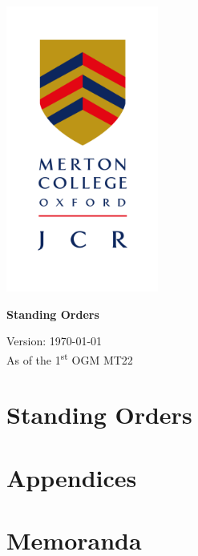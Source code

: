 \documentclass{standingorders}
\begin{document}
	\thispagestyle{empty}
	\begin{center}
		\includegraphics[width=5cm]{mertoncollegejcr}
		\begin{vplace}[0.1] \Huge  
			\textbf{Standing Orders}
		\end{vplace}
		{ {\Large
			Version: \today}\\
			\small As of the 1\textsuperscript{st} OGM MT22
			
		}
		\vfill
	\end{center}
	\cleardoublepage
	\frontmatter
	\tableofcontents
	
	
	\mainmatter
	\part{Standing Orders}
	
	
	
	
	
	
	
	
	
	
	
	\part{Appendices}
	\begin{appendices}
		
        
		
		
		
		
		
	\end{appendices}
	\part{Memoranda}
	\begin{appendices}
	\end{appendices}
\end{document}
